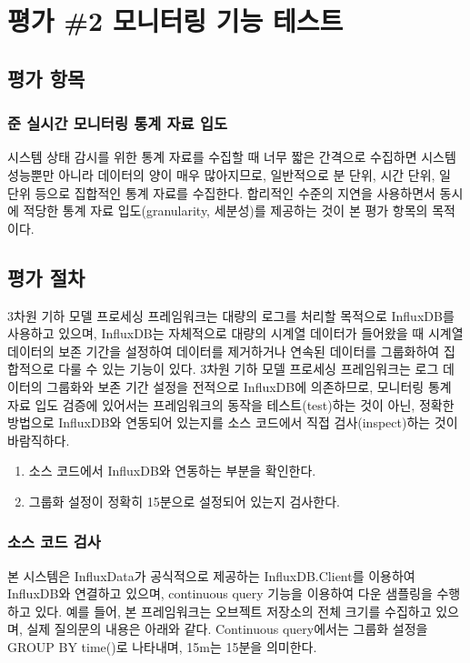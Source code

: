 \documentclass[11pt,oneside,openany,itemph,a4paper,chapter]{oblivoir}
\begin{document}
\section{평가 \#2\label{test2} 모니터링 기능 테스트}
\subsection{평가 항목}
\subsubsection{준 실시간 모니터링 통계 자료 입도}
시스템 상태 감시를 위한 통계 자료를 수집할 때 너무 짧은 간격으로 수집하면 시스템 성능뿐만 아니라 데이터의 양이 매우 많아지므로, 일반적으로 분 단위, 시간 단위, 일 단위 등으로 집합적인 통계 자료를 수집한다. 합리적인 수준의 지연을 사용하면서 동시에 적당한 통계 자료 입도(granularity, 세분성)를 제공하는 것이 본 평가 항목의 목적이다.

\subsection{평가 절차}
3차원 기하 모델 프로세싱 프레임워크는 대량의 로그를 처리할 목적으로 InfluxDB를 사용하고 있으며, InfluxDB는 자체적으로 대량의 시계열 데이터가 들어왔을 때 시계열 데이터의 보존 기간을 설정하여 데이터를 제거하거나 연속된 데이터를 그룹화하여 집합적으로 다룰 수 있는 기능이 있다. 3차원 기하 모델 프로세싱 프레임워크는 로그 데이터의 그룹화와 보존 기간 설정을 전적으로 InfluxDB에 의존하므로, 모니터링 통계 자료 입도 검증에 있어서는 프레임워크의 동작을 테스트(test)하는 것이 아닌, 정확한 방법으로 InfluxDB와 연동되어 있는지를 소스 코드에서 직접 검사(inspect)하는 것이 바람직하다.
\begin{enumerate}
    \item 소스 코드에서 InfluxDB와 연동하는 부분을 확인한다.
    \item 그룹화 설정이 정확히 15분으로 설정되어 있는지 검사한다.
\end{enumerate}

\subsubsection{소스 코드 검사}
본 시스템은 InfluxData가 공식적으로 제공하는 InfluxDB.Client를 이용하여 InfluxDB와 연결하고 있으며, continuous query 기능을 이용하여 다운 샘플링을 수행하고 있다. 예를 들어, 본 프레임워크는 오브젝트 저장소의 전체 크기를 수집하고 있으며, 실제 질의문의 내용은 아래와 같다. Continuous query에서는 그룹화 설정을 GROUP BY time()로 나타내며, 15m는 15분을 의미한다.
\end{document}
